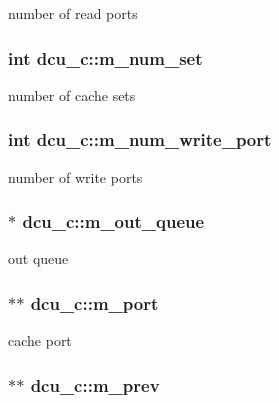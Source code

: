 \label{classdcu__c_aa5804689736f9d3db9e5d9a7a88a8b62}
number of read ports \hypertarget{classdcu__c_a54ee473e45b0d1a45afe5f569c22d3c1}{
\subsubsection[{m\_\-num\_\-set}]{\setlength{\rightskip}{0pt plus 5cm}int {\bf dcu\_\-c::m\_\-num\_\-set}}}
\label{classdcu__c_a54ee473e45b0d1a45afe5f569c22d3c1}
number of cache sets \hypertarget{classdcu__c_a490bfb196b859b4f3135368158c4e5e6}{
\subsubsection[{m\_\-num\_\-write\_\-port}]{\setlength{\rightskip}{0pt plus 5cm}int {\bf dcu\_\-c::m\_\-num\_\-write\_\-port}}}
\label{classdcu__c_a490bfb196b859b4f3135368158c4e5e6}
number of write ports \hypertarget{classdcu__c_a9c0c134e9407debd8308df39c9880e06}{
\subsubsection[{m\_\-out\_\-queue}]{$\ast$ {\bf dcu\_\-c::m\_\-out\_\-queue}}}
\label{classdcu__c_a9c0c134e9407debd8308df39c9880e06}
out queue \hypertarget{classdcu__c_a6fc4117756ccee0adf08285ad9ef9182}{
\subsubsection[{m\_\-port}]{$\ast$$\ast$ {\bf dcu\_\-c::m\_\-port}}}
\label{classdcu__c_a6fc4117756ccee0adf08285ad9ef9182}
cache port \hypertarget{classdcu__c_a199065735dfd67fbbf17f1e7e73a0b27}{
\subsubsection[{m\_\-prev}]{$\ast$$\ast$ {\bf dcu\_\-c::m\_\-prev}}}
